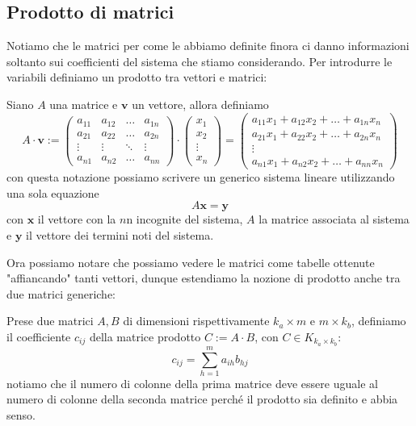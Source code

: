 \documentclass[11pt]{scrartcl}
\begin{document}
 	\subsection{Prodotto di matrici}
 	Notiamo che le matrici per come le abbiamo definite finora ci danno informazioni soltanto sui coefficienti del sistema che stiamo considerando. Per introdurre le variabili definiamo un prodotto tra vettori e matrici:
 	\begin{definition}
 		Siano $A$ una matrice e $\mathbf{v}$ un vettore, allora definiamo
 		$$A\cdot \mathbf{v} := 
 		\begin{pmatrix}
 			a_{11} & a_{12} & \dots & a_{1n} \\
 			a_{21} & a_{22} & \dots & a_{2n} \\
 			\vdots & \vdots & \ddots & \vdots \\
 			a_{n1} & a_{n2} & \dots & a_{nn}
 		\end{pmatrix}
 		\cdot
 		\begin{pmatrix}
 			x_1 \\
 			x_2 \\
 			\vdots \\
 			x_n
 		\end{pmatrix}
 		= 
 		\begin{pmatrix}
 			a_{11}x_1+a_{12}x_2+\dots+a_{1n}x_n \\
 			a_{21}x_1+a_{22}x_2+\dots+a_{2n}x_n \\
 			\vdots 								\\
 			a_{n1}x_1+a_{n2}x_2+\dots+a_{nn}x_n
 		\end{pmatrix}
 		$$
 		con questa notazione possiamo scrivere un generico sistema lineare utilizzando una sola equazione
 		$$A\mathbf{x}=\mathbf{y}$$
 		con $\mathbf{x}$ il vettore con la $n$n incognite del sistema, $A$ la matrice associata al sistema e $\mathbf{y}$ il vettore dei termini noti del sistema.
 	\end{definition}
 	Ora possiamo notare che possiamo vedere le matrici come tabelle ottenute "affiancando" tanti vettori, dunque estendiamo la nozione di prodotto anche tra due matrici generiche:
 	\begin{definition}
 		Prese due matrici $A,B$ di dimensioni rispettivamente $k_a\times m$ e $m \times k_b$, definiamo il coefficiente $c_{ij}$ della matrice prodotto $C:=A\cdot B$, con $C\in K_{k_a \times k_b}$:
 		$$c_{ij}=\sum_{h=1}^{m}a_{ih}b_{hj}$$
 		notiamo che il numero di colonne della prima matrice deve essere uguale al numero di colonne della seconda matrice perché il prodotto sia definito e abbia senso.
 	\end{definition}
\end{document}
